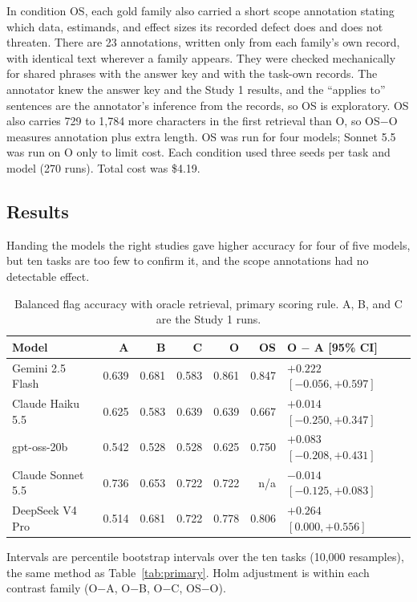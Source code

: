 \documentclass[11pt]{article}
\begin{document}
In condition OS, each gold family also carried a short scope annotation stating which data, estimands, and effect sizes its recorded defect does and does not threaten. There are 23 annotations, written only from each family's own record, with identical text wherever a family appears. They were checked mechanically for shared phrases with the answer key and with the task-own records. The annotator knew the answer key and the Study 1 results, and the ``applies to'' sentences are the annotator's inference from the records, so OS is exploratory. OS also carries 729 to 1,784 more characters in the first retrieval than O, so OS$-$O measures annotation plus extra length. OS was run for four models; Sonnet 5.5 was run on O only to limit cost. Each condition used three seeds per task and model (270 runs). Total cost was \$4.19.

\subsection{Results}

Handing the models the right studies gave higher accuracy for four of five models, but ten tasks are too few to confirm it, and the scope annotations had no detectable effect.

\begin{table}[ht]
\centering
\caption{Balanced flag accuracy with oracle retrieval, primary scoring rule. A, B, and C are the Study 1 runs.}
\label{tab:study1b}
\small
\begin{tabular}{lrrrrrl}
\toprule
Model & A & B & C & O & OS & O $-$ A [95\% CI] \\
\midrule
Gemini 2.5 Flash & 0.639 & 0.681 & 0.583 & 0.861 & 0.847 & $+0.222$ $[-0.056, +0.597]$ \\
Claude Haiku 5.5 & 0.625 & 0.583 & 0.639 & 0.639 & 0.667 & $+0.014$ $[-0.250, +0.347]$ \\
gpt-oss-20b & 0.542 & 0.528 & 0.528 & 0.625 & 0.750 & $+0.083$ $[-0.208, +0.431]$ \\
Claude Sonnet 5.5 & 0.736 & 0.653 & 0.722 & 0.722 & n/a & $-0.014$ $[-0.125, +0.083]$ \\
DeepSeek V4 Pro & 0.514 & 0.681 & 0.722 & 0.778 & 0.806 & $+0.264$ $[0.000, +0.556]$ \\
\bottomrule
\end{tabular}

\vspace{0.4em}
\begin{minipage}{0.92\linewidth}\footnotesize
Intervals are percentile bootstrap intervals over the ten tasks (10,000 resamples), the same method as Table~\ref{tab:primary}. Holm adjustment is within each contrast family (O$-$A, O$-$B, O$-$C, OS$-$O).
\end{minipage}
\end{table}
\end{document}
